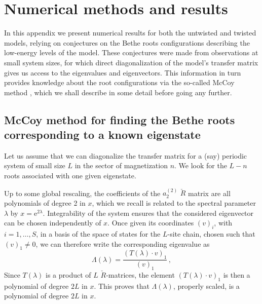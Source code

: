 \documentclass[11pt]{article}
\begin{document}
\section{Numerical methods and results}
\label{app:C}

In this appendix we present numerical results for both the untwisted and twisted models, relying on conjectures on the Bethe roots configurations describing the low-energy levels of the model. These conjectures were made from observations at small system sizes, for which direct diagonalization of the model's transfer matrix gives us access to the eigenvalues and eigenvectors. This information in turn provides knowledge about the root configurations via the so-called McCoy method \cite{McCoy1,McCoy2,NepomechieRavanini}, which we shall describe in some detail before going any further.  
 
\subsection{McCoy method for finding the Bethe roots corresponding to a known eigenstate}
 
Let us assume that we can diagonalize the transfer matrix for a (say) periodic system of small size $L$ in the sector of magnetization $n$. 
We look for the $L-n$ roots associated with one given eigenstate.

Up to some global rescaling, the coefficients of the $a_{2}^{(2)}$ $\check{R}$ matrix are all polynomials of degree 2 in $x$, which we recall is related to the spectral parameter $\lambda$ by $x=\mathrm{e}^{2\lambda}$. 
Integrability of the system ensures that the considered eigenvector can be chosen independently of $x$. 
Once given its coordinates $(v)_i$, with $i=1,\ldots,S$, in a basis of the space of states for the $L$-site chain, chosen such that $(v)_1 \neq 0$, we can therefore write the corresponding eigenvalue as 
%
\begin{equation}
 \Lambda(\lambda) = \frac{(T(\lambda) \cdot v)_1}{(v)_1} \,,
\end{equation}
%
Since $T(\lambda)$ is a product of $L$ $\check{R}$-matrices, the element $(T(\lambda) \cdot v)_1$ is then a polynomial of degree $2 L$ in $x$.  
This proves that $\Lambda(\lambda)$, properly scaled, is a polynomial of degree $2 L$ in $x$.  
%
\end{document}

